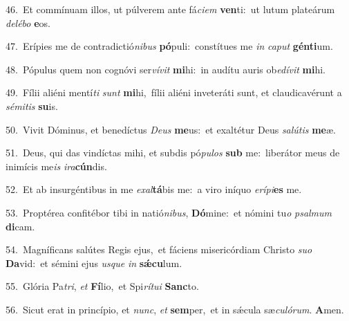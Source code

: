 {\numbfont\textcolor{\numbcolor}{46.}}~Et commínuam illos, ut púlverem ante fá\-\textit{ci}\-\textit{em} \textbf{ven}\-ti:~\star ut lutum plateárum \textit{de}\-\textit{lé}\textit{bo} \textbf{e}\-os.\par
{\numbfont\textcolor{\numbcolor}{47.}}~Erípies me de contradictió\-\textit{ni}\-\textit{bus} \textbf{pó}\-puli:~\star constítues me \textit{in} \textit{ca}\-\textit{put} \textbf{gén}\-\textbf{ti}um.\par
{\numbfont\textcolor{\numbcolor}{48.}}~Pópulus quem non cognóvi ser\-\textit{ví}\-\textit{vit} \textbf{mi}\-hi:~\star in audítu auris ob\-\textit{e}\-\textit{dí}\textit{vit} \textbf{mi}\-hi.\par
{\numbfont\textcolor{\numbcolor}{49.}}~Fílii aliéni mentí\textit{ti} \textit{sunt} \textbf{mi}\-hi,~\star fílii aliéni inveteráti sunt, et claudicavérunt a \textit{sé}\-\textit{mi}\textit{tis} \textbf{su}\-is.\par
{\numbfont\textcolor{\numbcolor}{50.}}~Vivit Dóminus, et benedíctus \textit{De}\-\textit{us} \textbf{me}\-us:~\star et exaltétur Deus \textit{sa}\-\textit{lú}\textit{tis} \textbf{me}\-æ.\par
{\numbfont\textcolor{\numbcolor}{51.}}~Deus, qui das vindíctas mihi, et subdis pó\-\textit{pu}\-\textit{los} \textbf{sub} me:~\star liberátor meus de inimícis me\textit{is} \textit{i}\-\textit{ra}\textbf{cún}dis.\par
{\numbfont\textcolor{\numbcolor}{52.}}~Et ab insurgéntibus in me \textit{ex}\-\textit{al}\textbf{tá}bis me:~\star a viro iníquo \textit{e}\-\textit{rí}\textit{pi}\textbf{es} me.\par
{\numbfont\textcolor{\numbcolor}{53.}}~Proptérea confitébor tibi in natió\-\textit{ni}\-\textit{bus}, \textbf{Dó}\-mine:~\star et nómini tu\textit{o} \textit{psal}\-\textit{mum} \textbf{di}\-cam.\par
{\numbfont\textcolor{\numbcolor}{54.}}~Magníficans salútes Regis ejus,~\dagger et fáciens misericórdiam Christo \textit{su}\-\textit{o} \textbf{Da}\-vid:~\star et sémini ejus \textit{us}\-\textit{que} \textit{in} \textbf{sǽ}\-\textbf{cu}lum.\par
{\numbfont\textcolor{\numbcolor}{55.}}~Glória Pa\-\textit{tri}\-, \textit{et} \textbf{Fí}\-lio,~\star et Spi\-\textit{rí}\-\textit{tu}\textit{i} \textbf{Sanc}\-to.\par
{\numbfont\textcolor{\numbcolor}{56.}}~Sicut erat in princípio, et \textit{nunc}\-, \textit{et} \textbf{sem}\-per,~\star et in sǽcula sæ\-\textit{cu}\-\textit{ló}\textit{rum}. \textbf{A}\-men.\par
